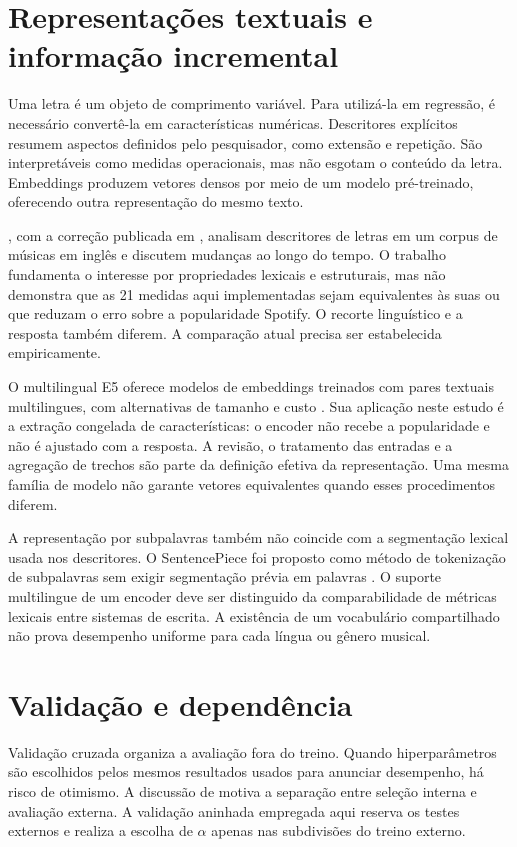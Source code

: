 \section{Representações textuais e informação incremental}
Uma letra é um objeto de comprimento variável. Para utilizá-la em regressão, é necessário convertê-la em características numéricas. Descritores explícitos resumem aspectos definidos pelo pesquisador, como extensão e repetição. São interpretáveis como medidas operacionais, mas não esgotam o conteúdo da letra. Embeddings produzem vetores densos por meio de um modelo pré-treinado, oferecendo outra representação do mesmo texto.

\citet{parada2024lyrics}, com a correção publicada em \citet{parada2024correction}, analisam descritores de letras em um corpus de músicas em inglês e discutem mudanças ao longo do tempo. O trabalho fundamenta o interesse por propriedades lexicais e estruturais, mas não demonstra que as 21 medidas aqui implementadas sejam equivalentes às suas ou que reduzam o erro sobre a popularidade Spotify. O recorte linguístico e a resposta também diferem. A comparação atual precisa ser estabelecida empiricamente.

O multilingual E5 oferece modelos de embeddings treinados com pares textuais multilingues, com alternativas de tamanho e custo \citep{wang2024}. Sua aplicação neste estudo é a extração congelada de características: o encoder não recebe a popularidade e não é ajustado com a resposta. A revisão, o tratamento das entradas e a agregação de trechos são parte da definição efetiva da representação. Uma mesma família de modelo não garante vetores equivalentes quando esses procedimentos diferem.

A representação por subpalavras também não coincide com a segmentação lexical usada nos descritores. O SentencePiece foi proposto como método de tokenização de subpalavras sem exigir segmentação prévia em palavras \citep{kudo2018}. O suporte multilingue de um encoder deve ser distinguido da comparabilidade de métricas lexicais entre sistemas de escrita. A existência de um vocabulário compartilhado não prova desempenho uniforme para cada língua ou gênero musical.

\section{Validação e dependência}
Validação cruzada organiza a avaliação fora do treino. Quando hiperparâmetros são escolhidos pelos mesmos resultados usados para anunciar desempenho, há risco de otimismo. A discussão de \citet{cawley2010} motiva a separação entre seleção interna e avaliação externa. A validação aninhada empregada aqui reserva os testes externos e realiza a escolha de $\alpha$ apenas nas subdivisões do treino externo.

